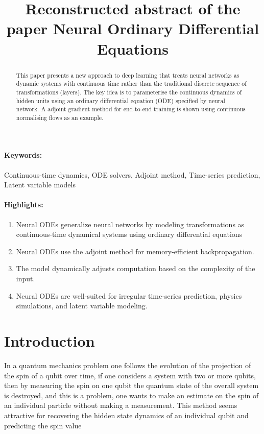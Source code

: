 \documentclass[12pt]{article}
\title{Reconstructed abstract of the paper Neural Ordinary Differential Equations}
\date{}
\begin{document}
\maketitle

\begin{abstract}
This paper presents a new approach to deep learning that treats neural networks as dynamic systems with continuous time rather than the traditional discrete sequence of transformations (layers). The key idea is to parameterise the continuous
dynamics of hidden units using an ordinary differential equation (ODE) specified by neural network. A adjoint gradient method for end-to-end training is shown using continuous normalising flows as an example.

\end{abstract}
\paragraph{Keywords:} 

Continuous-time dynamics,
ODE solvers,
Adjoint method,
Time-series prediction,
Latent variable models





\paragraph{Highlights:}
\begin{enumerate}
\item Neural ODEs generalize neural networks by modeling transformations as continuous-time dynamical systems using ordinary differential equations
\item Neural ODEs use the adjoint method for memory-efficient backpropagation.
\item The model dynamically adjusts computation based on the complexity of the input.
\item Neural ODEs are well-suited for irregular time-series prediction, physics simulations, and latent variable modeling.
\end{enumerate}

\section{Introduction}
In a quantum mechanics problem one follows the evolution of the projection of the spin of a qubit over time, if one considers a system with two or more qubits, then by measuring the spin on one qubit the quantum state of the overall system is destroyed, and this is a problem, one wants to make an estimate on the spin of an individual particle without making a measurement.  This method seems attractive for recovering the hidden state dynamics of an individual qubit and predicting the spin value
\end{document}

